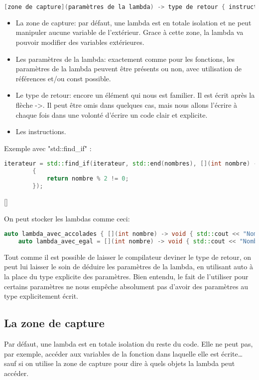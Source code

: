 \documentclass{article}
\begin{document}
\begin{itemize}
\begin{lstlisting}[language=C++]
[zone de capture](paramètres de la lambda) -> type de retour { instructions }
\end{lstlisting}{}

\begin{itemize}
    \item La zone de capture: par défaut, une lambda est en totale isolation et ne peut manipuler aucune variable de l’extérieur. Grace à cette zone, la lambda va pouvoir modifier des variables extérieures.
    \item Les paramètres de la lambda: exactement comme pour les fonctions, les paramètres de la lambda peuvent être présents ou non, avec utilisation de références et/ou const possible.
    \item Le type de retour: encore un élément qui nous est familier. Il est écrit après la flèche ->. Il peut être omis dans quelques cas, mais nous allons l’écrire à chaque fois dans une volonté d’écrire un code clair et explicite.
    \item Les instructions.
\end{itemize}{}

Exemple avec "std::find\_if" :
\begin{lstlisting}[language=C++]
iterateur = std::find_if(iterateur, std::end(nombres), [](int nombre) -> bool
        {
            return nombre % 2 != 0;
        });
\end{lstlisting}[]

On peut stocker les lambdas comme ceci:
\begin{lstlisting}[language=C++]
    auto lambda_avec_accolades { [](int nombre) -> void { std::cout << "Nombre reçu : " << nombre << std::endl; } };
    auto lambda_avec_egal = [](int nombre) -> void { std::cout << "Nombre reçu : " << nombre << std::endl; };
\end{lstlisting}{}

Tout comme il est possible de laisser le compilateur deviner le type de retour, on peut lui laisser le soin de déduire les paramètres de la lambda, en utilisant auto à la place du type explicite des paramètres. Bien entendu, le fait de l’utiliser pour certains paramètres ne nous empêche absolument pas d’avoir des paramètres au type explicitement écrit.

\subsection{La zone de capture}
Par défaut, une lambda est en totale isolation du reste du code. Elle ne peut pas, par exemple, accéder aux variables de la fonction dans laquelle elle est écrite… sauf si on utilise la zone de capture pour dire à quels objets la lambda peut accéder.



\end{itemize}
\end{document}
